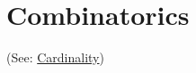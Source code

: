 \section{Combinatorics}\label{combinatorics}

(See: \hyperref[cardinalnumbers]{Cardinality})







